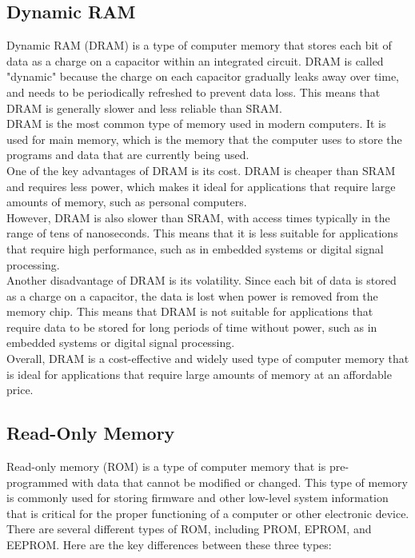 \subsection{Dynamic RAM}
Dynamic RAM (DRAM) is a type of computer memory that stores each bit of data as a charge on a capacitor within an integrated circuit. DRAM is called "dynamic" because the charge on each capacitor gradually leaks away over time, and needs to be periodically refreshed to prevent data loss. This means that DRAM is generally slower and less reliable than SRAM.\\
DRAM is the most common type of memory used in modern computers. It is used for main memory, which is the memory that the computer uses to store the programs and data that are currently being used.\\
One of the key advantages of DRAM is its cost. DRAM is cheaper than SRAM and requires less power, which makes it ideal for applications that require large amounts of memory, such as personal computers.\\
However, DRAM is also slower than SRAM, with access times typically in the range of tens of nanoseconds. This means that it is less suitable for applications that require high performance, such as in embedded systems or digital signal processing.\\
Another disadvantage of DRAM is its volatility. Since each bit of data is stored as a charge on a capacitor, the data is lost when power is removed from the memory chip. This means that DRAM is not suitable for applications that require data to be stored for long periods of time without power, such as in embedded systems or digital signal processing.\\
Overall, DRAM is a cost-effective and widely used type of computer memory that is ideal for applications that require large amounts of memory at an affordable price.\\

\subsection{Read-Only Memory}
Read-only memory (ROM) is a type of computer memory that is pre-programmed with data that cannot be modified or changed. This type of memory is commonly used for storing firmware and other low-level system information that is critical for the proper functioning of a computer or other electronic device.\\
There are several different types of ROM, including PROM, EPROM, and EEPROM. Here are the key differences between these three types:

